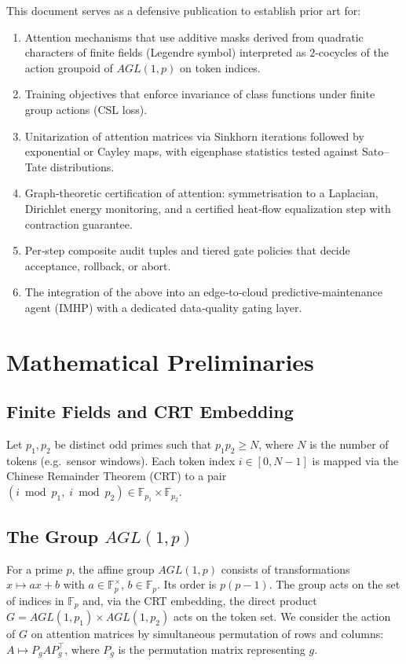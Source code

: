\documentclass[12pt]{article}
\theoremstyle{plain}
\theoremstyle{definition}
\theoremstyle{remark}
\begin{document}
This document serves as a defensive publication to establish prior art for:
\begin{enumerate}
    \item Attention mechanisms that use additive masks derived from quadratic characters of finite fields (Legendre symbol) interpreted as $2$-cocycles of the action groupoid of $AGL(1,p)$ on token indices.
    \item Training objectives that enforce invariance of class functions under finite group actions (CSL loss).
    \item Unitarization of attention matrices via Sinkhorn iterations followed by exponential or Cayley maps, with eigenphase statistics tested against Sato--Tate distributions.
    \item Graph‑theoretic certification of attention: symmetrisation to a Laplacian, Dirichlet energy monitoring, and a certified heat‑flow equalization step with contraction guarantee.
    \item Per‑step composite audit tuples and tiered gate policies that decide acceptance, rollback, or abort.
    \item The integration of the above into an edge‑to‑cloud predictive‑maintenance agent (IMHP) with a dedicated data‑quality gating layer.
\end{enumerate}

\section{Mathematical Preliminaries}
\label{sec:prelim}

\subsection{Finite Fields and CRT Embedding}
Let $p_1, p_2$ be distinct odd primes such that $p_1 p_2 \ge N$, where $N$ is the number of tokens (e.g.\ sensor windows). Each token index $i \in [0, N-1]$ is mapped via the Chinese Remainder Theorem (CRT) to a pair $(i \bmod p_1,\; i \bmod p_2) \in \mathbb{F}_{p_1} \times \mathbb{F}_{p_2}$.

\subsection{The Group $AGL(1,p)$}
For a prime $p$, the affine group $AGL(1,p)$ consists of transformations $x \mapsto a x + b$ with $a \in \mathbb{F}_p^\times$, $b \in \mathbb{F}_p$. Its order is $p(p-1)$. The group acts on the set of indices in $\mathbb{F}_p$ and, via the CRT embedding, the direct product $G = AGL(1,p_1) \times AGL(1,p_2)$ acts on the token set. We consider the action of $G$ on attention matrices by simultaneous permutation of rows and columns: $A \mapsto P_g A P_g^\top$, where $P_g$ is the permutation matrix representing $g$.
\end{document}
